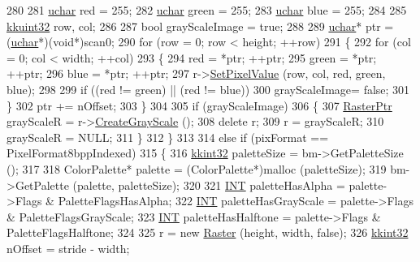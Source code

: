 \begin{DoxyCode}
280 
281       \hyperlink{namespace_k_k_b_ace9969169bf514f9ee6185186949cdf7}{uchar}  red   = 255;
282       \hyperlink{namespace_k_k_b_ace9969169bf514f9ee6185186949cdf7}{uchar}  green = 255;
283       \hyperlink{namespace_k_k_b_ace9969169bf514f9ee6185186949cdf7}{uchar}  blue  = 255;
284       
285       \hyperlink{namespace_k_k_b_af8d832f05c54994a1cce25bd5743e19a}{kkuint32}  row, col;
286 
287       \textcolor{keywordtype}{bool}  grayScaleImage = \textcolor{keyword}{true};
288 
289       \hyperlink{namespace_k_k_b_ace9969169bf514f9ee6185186949cdf7}{uchar}*  ptr = (\hyperlink{namespace_k_k_b_ace9969169bf514f9ee6185186949cdf7}{uchar}*)(\textcolor{keywordtype}{void}*)scan0;
290       \textcolor{keywordflow}{for}  (row = 0;  row < height;  ++row)
291       \{
292         \textcolor{keywordflow}{for}  (col = 0;  col < width;  ++col)
293         \{
294           red   = *ptr;  ++ptr;
295           green = *ptr;  ++ptr;
296           blue  = *ptr;  ++ptr;
297           r->\hyperlink{class_k_k_b_1_1_raster_a5ddb8bd069dc64241941b0b011af8667}{SetPixelValue} (row, col, red, green, blue);
298 
299           \textcolor{keywordflow}{if}  ((red != green)  ||  (red != blue))
300             grayScaleImage= \textcolor{keyword}{false};
301         \}
302         ptr += nOffset;
303       \}
304 
305       \textcolor{keywordflow}{if}  (grayScaleImage)
306       \{
307         \hyperlink{class_k_k_b_1_1_raster}{RasterPtr}  grayScaleR = r->\hyperlink{class_k_k_b_1_1_raster_ab2a2f8d11f4d51cbc5418069a7b58299}{CreateGrayScale} ();
308         \textcolor{keyword}{delete}  r;
309         r = grayScaleR;
310         grayScaleR = NULL;
311       \}
312     \}
313 
314     \textcolor{keywordflow}{else} \textcolor{keywordflow}{if}  (pixFormat == PixelFormat8bppIndexed)
315     \{
316       \hyperlink{namespace_k_k_b_a8fa4952cc84fda1de4bec1fbdd8d5b1b}{kkint32}  paletteSize = bm->GetPaletteSize ();
317 
318       ColorPalette* palette = (ColorPalette*)malloc (paletteSize);
319       bm->GetPalette (palette, paletteSize);
320 
321       \hyperlink{_usf_cas_cor_8h_afeeffe52c8fd59db7c61cf8b02042dbf}{INT}  paletteHasAlpha     = palette->Flags & PaletteFlagsHasAlpha;
322       \hyperlink{_usf_cas_cor_8h_afeeffe52c8fd59db7c61cf8b02042dbf}{INT}  paletteHasGrayScale = palette->Flags & PaletteFlagsGrayScale;
323       \hyperlink{_usf_cas_cor_8h_afeeffe52c8fd59db7c61cf8b02042dbf}{INT}  paletteHasHalftone  = palette->Flags & PaletteFlagsHalftone;
324 
325       r = \textcolor{keyword}{new} \hyperlink{class_k_k_b_1_1_raster}{Raster} (height, width, \textcolor{keyword}{false});
326       \hyperlink{namespace_k_k_b_a8fa4952cc84fda1de4bec1fbdd8d5b1b}{kkint32}  nOffset = stride - width;

\end{DoxyCode}
